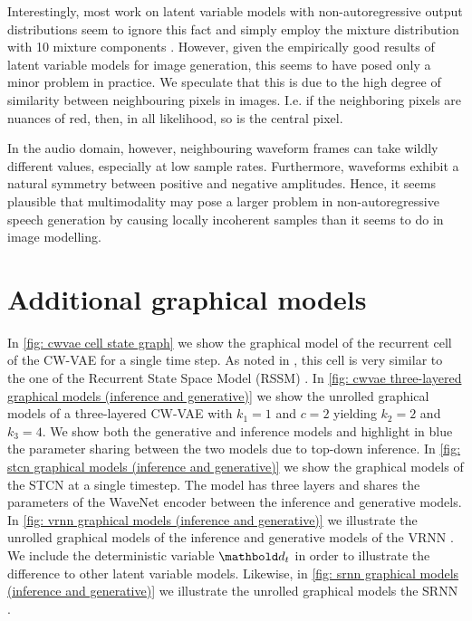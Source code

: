 {Interestingly, most work on latent variable models with non-autoregressive output distributions seem to ignore this fact and simply employ the mixture distribution with 10 mixture components \parencite{maaloe_biva_2019, vahdat_nvae_2020, child_very_2021}.
However, given the empirically good results of latent variable models for image generation, this seems to have posed only a minor problem in practice. We speculate that this is due to the high degree of similarity between neighbouring pixels in images. I.e. if the neighboring pixels are nuances of red, then, in all likelihood, so is the central pixel.

In the audio domain, however, neighbouring waveform frames can take wildly different values, especially at low sample rates. Furthermore, waveforms exhibit a natural symmetry between positive and negative amplitudes.
Hence, it seems plausible that multimodality may pose a larger problem in non-autoregressive speech generation by causing locally incoherent samples than it seems to do in image modelling.


\section{Additional graphical models}\label{app: additional graphical models}
In \cref{fig: cwvae cell state graph} we show the graphical model of the recurrent cell of the CW-VAE for a single time step. As noted in \parencite{saxena_clockwork_2021}, this cell is very similar to the one of the Recurrent State Space Model (RSSM) \parencite{hafner_learning_2019}.
In \cref{fig: cwvae three-layered graphical models (inference and generative)} we show the unrolled graphical models of a three-layered CW-VAE with $k_1=1$ and $c=2$ yielding $k_2=2$ and $k_3=4$. 
We show both the generative and inference models and highlight in blue the parameter sharing between the two models due to top-down inference.
In \cref{fig: stcn graphical models (inference and generative)} we show the graphical models of the STCN \parencite{aksan_stcn_2019} at a single timestep. The model has three layers and shares the parameters of the WaveNet encoder between the inference and generative models.
In \cref{fig: vrnn graphical models (inference and generative)} we illustrate the unrolled graphical models of the inference and generative models of the VRNN \parencite{chung_recurrent_2015}. We include the deterministic variable $\db_t$ in order to illustrate the difference to other latent variable models.
Likewise, in \cref{fig: srnn graphical models (inference and generative)} we illustrate the unrolled graphical models the SRNN \parencite{fraccaro_sequential_2016}.


}
